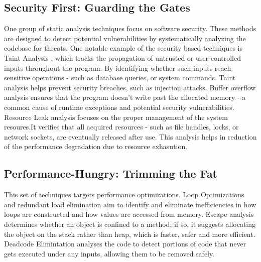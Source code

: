 \subsection{Security First: Guarding the Gates}
One group of static analysis techniques focus on software security. These methods are designed to detect potential vulnerabilities by systematically analyzing the codebase for threats.
One notable example of the security based techniques is Taint Analysis \cite{arzt2014flowdroid,huang2015scalable,lerch2014flowtwist,tripp2009taj}, which tracks the propagation of untrusted or user-controlled inputs throughout the program. By identifying whether such inputs reach sensitive operations - such as database queries, or system commands.
Taint analysis helps prevent security breaches, such as injection attacks. 
Buffer overflow analysis \cite{bufferoverflow,le2008marple,xie2003archer} ensures that the program doesn't write past the allocated memory - a common cause of runtime exceptions and potential security vulnerabilities.
Resource Leak analysis \cite{weimer2004finding} focuses on the proper management of the system resoures.It verifies that all acquired resources - such as file handles, locks, or network sockets, are eventually released after use. This analysis helps in reduction of the performance degradation due to resource exhasution.

\subsection{Performance-Hungry: Trimming the Fat}
This set of techniques targets performance optimizations. Loop Optimizations \cite{muchnick1997advanced} and redundant load elimination aim to identify and eliminate inefficiencies in how loops are constructed and how values are accessed from memory.
Escape analysis \cite{choi1999escape} determines whether an object is confined to a method; if so, it suggests allocating the object on the stack rather than heap, which is faster, safer and more efficient.
Deadcode Elimintation \cite{bodik1997partial,knoop1994partial} analyses the code to detect portions of code that never gets executed under any inputs, allowing them to be removed safely.